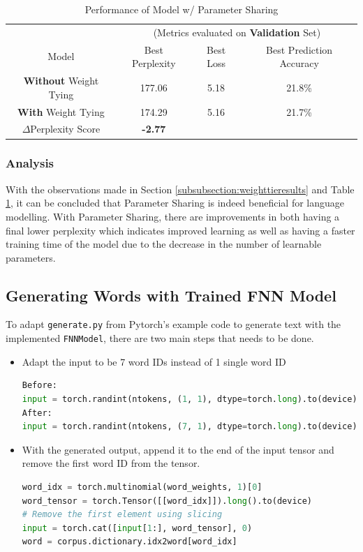 \documentclass[sigconf,nonacm=true]{acmart}
\begin{document}
\begin{table}[H]
	\label{tab:weighttiecomp}
	\begin{adjustbox}{width=\columnwidth}
		\begin{tabular}{cccc}
			\toprule
			&\multicolumn{3}{c}{(Metrics evaluated on \textbf{Validation} Set)}\\
			Model &Best Perplexity&Best Loss&Best Prediction Accuracy\\
			\midrule
			\textbf{Without} Weight Tying & 177.06 & 5.18 & 21.8\% \\
			\textbf{With} Weight Tying & 174.29 & 5.16 & 21.7\% \\
			\midrule
			$\Delta$Perplexity Score & \textbf{-2.77}\\
			\bottomrule
		\end{tabular}
	\end{adjustbox}
	\caption{Performance of Model w/ Parameter Sharing}
\end{table}

\subsubsection{Analysis}
With the observations made in Section \ref{subsubsection:weighttieresults} and Table \ref{tab:weighttiecomp}, it can be concluded that Parameter Sharing is indeed beneficial for language modelling. With Parameter Sharing, there are improvements in both having a final lower perplexity which indicates improved learning as well as having a faster training time of the model due to the decrease in the number of learnable parameters.


\subsection{Generating Words with Trained FNN Model}
To adapt \verb|generate.py| from Pytorch's example code to generate text with the implemented \verb|FNNModel|, there are two main steps that needs to be done.
\begin{itemize}
	\item Adapt the input to be 7 word IDs instead of 1 single word ID
	
	\begin{lstlisting}[language=python]
Before:
input = torch.randint(ntokens, (1, 1), dtype=torch.long).to(device)
After:
input = torch.randint(ntokens, (7, 1), dtype=torch.long).to(device)
	\end{lstlisting}
	
	\item With the generated output, append it to the end of the input tensor and remove the first word ID from the tensor.
	\begin{lstlisting}[language=python]
word_idx = torch.multinomial(word_weights, 1)[0]
word_tensor = torch.Tensor([[word_idx]]).long().to(device)
# Remove the first element using slicing
input = torch.cat([input[1:], word_tensor], 0)
word = corpus.dictionary.idx2word[word_idx]
	\end{lstlisting}
\end{itemize} 
\end{document}
